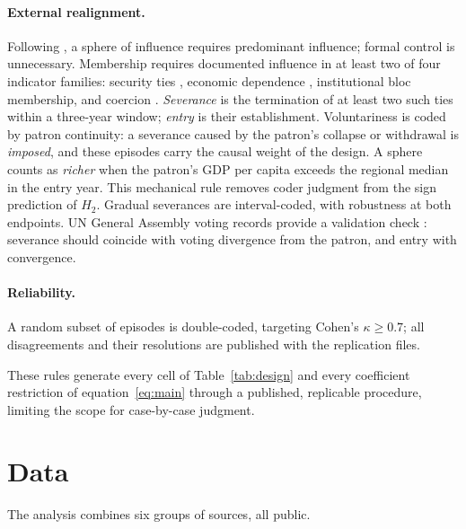 \documentclass[11pt]{article}
\begin{document}
\paragraph{External realignment.} Following \textcite{keal_1983}, a sphere of influence requires predominant influence; formal control is unnecessary. Membership requires documented influence in at least two of four indicator families: security ties \parencite{leeds_etal_2002,gibler_sarkees_2004}, economic dependence \parencite{imf_dots}, institutional bloc membership, and coercion \parencite{felbermayr_etal_2020}. \emph{Severance} is the termination of at least two such ties within a three-year window; \emph{entry} is their establishment. Voluntariness is coded by patron continuity: a severance caused by the patron's collapse or withdrawal is \emph{imposed}, and these episodes carry the causal weight of the design. A sphere counts as \emph{richer} when the patron's GDP per capita exceeds the regional median in the entry year. This mechanical rule removes coder judgment from the sign prediction of $H_2$. Gradual severances are interval-coded, with robustness at both endpoints. UN General Assembly voting records provide a validation check \parencite{bailey_strezhnev_voeten_2017}: severance should coincide with voting divergence from the patron, and entry with convergence.

\paragraph{Reliability.} A random subset of episodes is double-coded, targeting Cohen's $\kappa \geq 0.7$; all disagreements and their resolutions are published with the replication files.

These rules generate every cell of Table~\ref{tab:design} and every coefficient restriction of equation~\eqref{eq:main} through a published, replicable procedure, limiting the scope for case-by-case judgment.

\section{Data}
\label{sec:data}

The analysis combines six groups of sources, all public.
\end{document}

